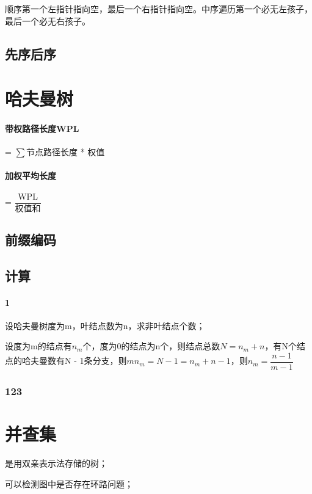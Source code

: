 顺序第一个左指针指向空，最后一个右指针指向空。中序遍历第一个必无左孩子，最后一个必无右孩子。


\subsection{先序后序}


\section{哈夫曼树}

\paragraph{带权路径长度WPL}
 = \(\sum\)节点路径长度 * 权值

\paragraph{加权平均长度}
 = \(\dfrac{\text{WPL}}{\text{权值和}}\)

\subsection{前缀编码}

\subsection{计算}

\paragraph{1}
设哈夫曼树度为m，叶结点数为n，求非叶结点个数；

设度为m的结点有\(n_m\)个，度为0的结点为n个，则结点总数\(N = n_m + n\)，有N个结点的哈夫曼数有N - 1条分支，则\(mn_m = N - 1 = n_m + n - 1\)，则\(n_m = \dfrac{n - 1}{m - 1}\)


\subsubsection{123}


\section{并查集}

是用双亲表示法存储的树；

可以检测图中是否存在环路问题；

